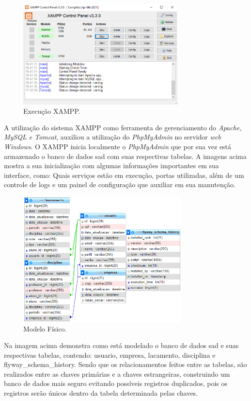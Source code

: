     \begin{figure}[h]
    \centering
    \includegraphics[width=0.75\textwidth]{./img/XAMPP.png}
    \caption{Execução XAMPP.}
    \label{fig:XAMPP}
    \end{figure}
    
    A utilização do sistema XAMPP como ferramenta de gerenciamento do \textit{Apache, MySQL e Tomcat}, auxiliou a utilização do \textit{PhpMyAdmin} no servidor \textit{web Windows}. O XAMPP inicia localmente o \textit{PhpMyAdmin} que por sua vez está armazenado o banco de dados sad com suas respectivas tabelas. A imagens acima mostra a sua inicialização com algumas informações importantes em sua interface, como: Quais serviços estão em execução, portas utilizadas, além de um controle de logs e um painel de configuração que auxiliar em sua manutenção.

    \begin{figure}[h]
    \centering
    \includegraphics[width=0.77\textwidth]{./img/ModeloFisico.png}
    \caption{Modelo Físico.}
    \label{fig:ModeloFisico}
    \end{figure}
    
    Na imagem acima demonstra como está modelado o banco de dados sad e suas respectivas tabelas, contendo: usuario, empresa, lacamento, disciplina e flyway\_schema\_history. Sendo que os relacionamentos feitos entre as tabelas, são realizados entre as chaves primárias e a chaves estrangeiras, construindo um banco de dados mais seguro evitando possíveis registros duplicados, pois os registros serão únicos dentro da tabela determinada pelas chaves.
        
